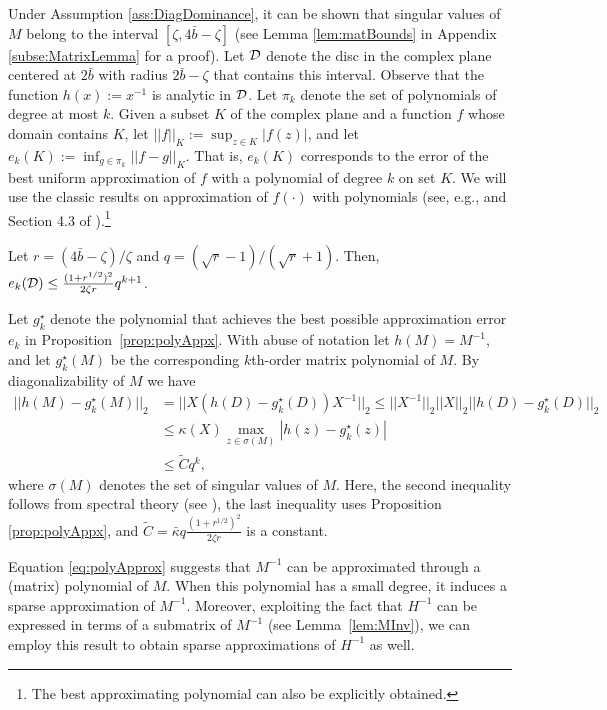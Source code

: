 \documentclass[opre,nonblindrev]{informs3} %
\begin{document}
Under Assumption \ref{ass:DiagDominance}, it can be shown that singular values of $M$ belong to the interval
$[\zeta, 4\bar{b}-\zeta]$ (see Lemma \ref{lem:matBounds} in Appendix \ref{subse:MatrixLemma} for a proof).
Let ${\cal D}$ denote the disc
in the complex plane
centered at $2\bar{b}$ with radius $2\bar{b}-\zeta$ that contains this interval.
Observe that the function $h(x):= x^{-1}$ is analytic in ${\cal D}$.
Let $\pi_k$ denote the set of polynomials of degree at most $k$. Given a subset $K$ of the complex plane
and a function $f$ whose domain contains $K$,
let
$||f||_K := \sup_{z\in K} |f(z)|$, and let
$e_k(K) :=  \inf_{g\in \pi_k} ||f-g||_K$. That is,  $e_k(K)$ corresponds to the error of the best
uniform approximation of $f$ with a polynomial of degree $k$ on set $K$.
We will use the classic results on approximation of $f(\cdot)$ with polynomials (see, e.g., \citet{demko1984decay} and Section 4.3 of \citet{meinardus2012approximation}).\footnote{The best approximating polynomial can also be explicitly obtained.}
\begin{proposition}\label{prop:polyAppx}
	Let $r=(4\bar{b}-\zeta)/\zeta$ and $q= (\sqrt{r}-1)/(\sqrt{r}+1)$. Then,
	$e_k({\cal D}) \leq \frac{(1+r^{1/2})^2}{2\zeta r}q^{k+1}$.
\end{proposition}
Let $g_k^\star$ denote the polynomial that
achieves the best possible approximation error $e_k$ in Proposition~\ref{prop:polyAppx}.
With abuse of notation let $h(M)=M^{-1}$,
and let
$g^\star_k(M)$ be the corresponding  $k$th-order matrix polynomial of $M$.
By diagonalizability of $M$ we have
\begin{equation} \label{eq:polyApprox}
\begin{aligned}
|| h(M) - g_k^\star(M) ||_2
&= || X( h(D)-g_k^\star(D) ) X^{-1} ||_2
\leq ||X^{-1}||_2 || X||_2 || h(D)-g_k^\star(D)||_2\\
&\leq
\kappa (X) \max_{z\in \sigma(M)} |h(z) - g_k^\star(z)|\\
& \leq
\tilde{C}
q^k,
\end{aligned}
\end{equation}
where $\sigma(M)$ denotes the set of singular values of $M$.
Here,   the second inequality follows from spectral theory (see  \citet{demko1984decay}),
the last inequality uses Proposition \ref{prop:polyAppx}, and $\tilde{C}=\bar{\kappa}q\frac{(1+r^{1/2})^2}{2 \zeta r}$ is a constant.



Equation \eqref{eq:polyApprox} suggests that $M^{-1}$ can be approximated through a (matrix) polynomial of $M$.
When this polynomial has a small degree, it induces a sparse approximation of $M^{-1}$.
Moreover,  exploiting the
fact that
$H^{-1}$ can be expressed in terms of a submatrix of $M^{-1}$  (see Lemma~\ref{lem:MInv}),
we can employ
 this result  to obtain sparse approximations of $H^{-1}$ as well.
\end{document}
